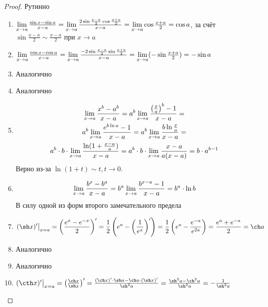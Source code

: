 \begin{proof}
	Рутинно
	\begin{enumerate}
		\item $\lim\limits_{x \to a} \frac{\sin x - \sin a}{x - a} = \lim\limits_{x \to a} \frac{2 \sin \frac{x - a}{2} \cos \frac{x + a}{2}}{x - a} = \lim\limits_{x \to a} \cos \frac{x + a}{2} = \cos a$, за счёт $\sin \frac{x - a}{2} \sim \frac{x - a}{2}$ при $x \to a$
		
		\item $\lim\limits_{x \to a} \frac{\cos x - \cos a}{x - a} = \lim\limits_{x \to a} \frac{-2 \sin \frac{x - a}{2} \sin \frac{x + a}{2}}{x - a} = \lim\limits_{x \to a} (-\sin \frac{x + a}{2}) = -\sin a$
		
		\item Аналогично
		\item Аналогично
		\item 
		\begin{multline*}
		\lim\limits_{x \to a} \frac{x^b - a^b}{x - a} = a^b \lim\limits_{x \to a} \frac{\left(\frac{x}{a}\right)^b - 1}{x - a} = \\
		a^b \lim\limits_{x \to a} \frac{e^{b \ln a} - 1}{x - a} = a^b \lim\limits_{x \to a} \frac{b \ln \frac{x}{a}}{x - a} = \\
		a^b \cdot b \cdot \lim\limits_{x \to a} \frac{\ln(1 + \frac{x - a}{a})}{x - a} = a^b \cdot b \cdot \lim\limits_{x \to a} \frac{x - a}{a(x - a)} = b \cdot a^{b - 1}
		\end{multline*}
		Верно из-за $\ln (1 + t) \sim t, t \to 0$.
		
		\item
		$$
			\lim\limits_{x \to a} \frac{b^x - b^a}{x - a} = b^a \lim\limits_{x \to a} \frac{b^{x - a} - 1}{x - a} = b^a \cdot \ln b
		$$
		В силу одной из форм второго замечательного предела
		
		\item
		$$
			(\sh x)' \big|_{x = a} = \left(\frac{e^x - e^{-x}}{2}\right)' = \frac{1}{2}\left(e^a - \left(\frac{1}{e^x}\right)'\right) = \frac{1}{2}\left(e^a - \frac{e^{-a}}{e^{2a}}\right) = \frac{e^a + e^{-a}}{2} = \ch a
		$$
		
		\item Аналогично
		\item Аналогично
		\item $(\cth x)' \big|_{x = a} = \left(\frac{\ch x}{\sh x}\right)' = \frac{(\ch x)' \cdot \sh a - \ch a \cdot (\sh x)'}{\sh^2 a} = \frac{\sh^2 a - \ch^2 a}{\sh^2 a} = -\frac{1}{\sh^2 a}$
	\end{enumerate}
\end{proof}

